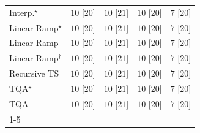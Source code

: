 \begin{tabular}{l|cccc|}
Interp.$^\star$ & {\cellcolor[HTML]{00441B}} \color[HTML]{F1F1F1} $10$ [$20$] & {\cellcolor[HTML]{00441B}} \color[HTML]{F1F1F1} $10$ [$21$] & {\cellcolor[HTML]{00441B}} \color[HTML]{F1F1F1} $10$ [$20$] & {\cellcolor[HTML]{F7FCF5}} \color[HTML]{000000} $7$ [$20$] \\
Linear Ramp$^\star$ & {\cellcolor[HTML]{00441B}} \color[HTML]{F1F1F1} $10$ [$20$] & {\cellcolor[HTML]{00441B}} \color[HTML]{F1F1F1} $10$ [$21$] & {\cellcolor[HTML]{00441B}} \color[HTML]{F1F1F1} $10$ [$20$] & {\cellcolor[HTML]{F7FCF5}} \color[HTML]{000000} $7$ [$20$] \\
Linear Ramp & {\cellcolor[HTML]{00441B}} \color[HTML]{F1F1F1} $10$ [$20$] & {\cellcolor[HTML]{00441B}} \color[HTML]{F1F1F1} $10$ [$21$] & {\cellcolor[HTML]{00441B}} \color[HTML]{F1F1F1} $10$ [$20$] & {\cellcolor[HTML]{F7FCF5}} \color[HTML]{000000} $7$ [$20$] \\
Linear Ramp$^\dagger$ & {\cellcolor[HTML]{00441B}} \color[HTML]{F1F1F1} $10$ [$20$] & {\cellcolor[HTML]{00441B}} \color[HTML]{F1F1F1} $10$ [$21$] & {\cellcolor[HTML]{00441B}} \color[HTML]{F1F1F1} $10$ [$20$] & {\cellcolor[HTML]{F7FCF5}} \color[HTML]{000000} $7$ [$20$] \\
Recursive TS & {\cellcolor[HTML]{00441B}} \color[HTML]{F1F1F1} $10$ [$20$] & {\cellcolor[HTML]{00441B}} \color[HTML]{F1F1F1} $10$ [$21$] & {\cellcolor[HTML]{00441B}} \color[HTML]{F1F1F1} $10$ [$20$] & {\cellcolor[HTML]{F7FCF5}} \color[HTML]{000000} $7$ [$20$] \\
TQA$^\star$ & {\cellcolor[HTML]{00441B}} \color[HTML]{F1F1F1} $10$ [$20$] & {\cellcolor[HTML]{00441B}} \color[HTML]{F1F1F1} $10$ [$21$] & {\cellcolor[HTML]{00441B}} \color[HTML]{F1F1F1} $10$ [$20$] & {\cellcolor[HTML]{F7FCF5}} \color[HTML]{000000} $7$ [$20$] \\
TQA & {\cellcolor[HTML]{00441B}} \color[HTML]{F1F1F1} $10$ [$20$] & {\cellcolor[HTML]{00441B}} \color[HTML]{F1F1F1} $10$ [$21$] & {\cellcolor[HTML]{00441B}} \color[HTML]{F1F1F1} $10$ [$20$] & {\cellcolor[HTML]{F7FCF5}} \color[HTML]{000000} $7$ [$20$] \\
\cline{1-5}
\bottomrule
\end{tabular}
